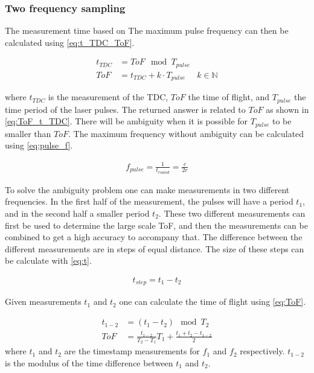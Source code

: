 \subsubsection{Two frequency sampling}

The measurement time based on The maximum pulse frequency can then be calculated using \cref{eq:t_TDC_ToF}.  

\begin{align}\label{eq:t_TDC_ToF}
	t_{TDC} &=ToF \mod T_{pulse}\\	
	ToF &= t_{TDC}+k\cdot T_{pulse} & k \in \mathbb{N}\label{eq:ToF_t_TDC}
\end{align}


where $t_{TDC}$ is the measurement of the TDC, $ToF$ the time of flight, and $T_{pulse}$ the time period of the laser pulses. The returned answer is related to $ToF$ as shown in \cref{eq:ToF_t_TDC}. There will be ambiguity when it is possible for $T_{pulse}$ to be smaller than $ToF$. The maximum frequency without ambiguity can be calculated using \cref{eq:pulse_f}.

\begin{align}\label{eq:pulse_f}
f_{pulse} = \frac{1}{t_{round}} = \frac{c}{2r}
\end{align}

To solve the ambiguity problem one can make measurements in two different frequencies. In the first half of the measurement, the pulses will have a period $t_1$, and in the second half a smaller period $t_2$. These two different measurements can first be used to determine the large scale ToF, and then the measurements can be combined to get a high accuracy to accompany that. The difference between the different measurements are in steps of equal distance. The size of these steps can be calculate with \cref{eq:t}.

\begin{align}\label{eq:t_step}
		t_{step} = t_1 - t_2
\end{align}

Given measurements $t_1$ and $t_2$ one can calculate the time of flight using \cref{eq:ToF}. 

\begin{align}
	t_{1-2} &= (t_1-t_2)\mod T_2\\
	ToF &= \frac{t_{1-2}}{T_2-T_1}T_1+\frac{t_1+t_2-t_{1-2}}{2}\label{eq:ToF}
\end{align}
where $t_1$ and $t_2$ are the timestamp measurements for $f_1$ and $f_2$ respectively. $t_{1-2}$ is the modulus of the time difference between $t_1$ and $t_2$.
